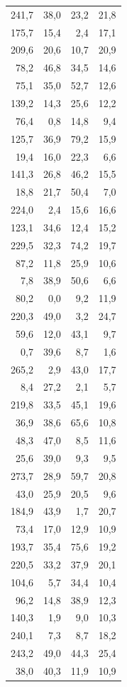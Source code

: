\documentclass[
  letterpaper,
  DIV=11,
  numbers=noendperiod]{scrreprt}
\begin{document}
\begin{longtable*}{rrrr}
241,7 & 38,0 & 23,2 & 21,8 \\ 
175,7 & 15,4 & 2,4 & 17,1 \\ 
209,6 & 20,6 & 10,7 & 20,9 \\ 
78,2 & 46,8 & 34,5 & 14,6 \\ 
75,1 & 35,0 & 52,7 & 12,6 \\ 
139,2 & 14,3 & 25,6 & 12,2 \\ 
76,4 & 0,8 & 14,8 & 9,4 \\ 
125,7 & 36,9 & 79,2 & 15,9 \\ 
19,4 & 16,0 & 22,3 & 6,6 \\ 
141,3 & 26,8 & 46,2 & 15,5 \\ 
18,8 & 21,7 & 50,4 & 7,0 \\ 
224,0 & 2,4 & 15,6 & 16,6 \\ 
123,1 & 34,6 & 12,4 & 15,2 \\ 
229,5 & 32,3 & 74,2 & 19,7 \\ 
87,2 & 11,8 & 25,9 & 10,6 \\ 
7,8 & 38,9 & 50,6 & 6,6 \\ 
80,2 & 0,0 & 9,2 & 11,9 \\ 
220,3 & 49,0 & 3,2 & 24,7 \\ 
59,6 & 12,0 & 43,1 & 9,7 \\ 
0,7 & 39,6 & 8,7 & 1,6 \\ 
265,2 & 2,9 & 43,0 & 17,7 \\ 
8,4 & 27,2 & 2,1 & 5,7 \\ 
219,8 & 33,5 & 45,1 & 19,6 \\ 
36,9 & 38,6 & 65,6 & 10,8 \\ 
48,3 & 47,0 & 8,5 & 11,6 \\ 
25,6 & 39,0 & 9,3 & 9,5 \\ 
273,7 & 28,9 & 59,7 & 20,8 \\ 
43,0 & 25,9 & 20,5 & 9,6 \\ 
184,9 & 43,9 & 1,7 & 20,7 \\ 
73,4 & 17,0 & 12,9 & 10,9 \\ 
193,7 & 35,4 & 75,6 & 19,2 \\ 
220,5 & 33,2 & 37,9 & 20,1 \\ 
104,6 & 5,7 & 34,4 & 10,4 \\ 
96,2 & 14,8 & 38,9 & 12,3 \\ 
140,3 & 1,9 & 9,0 & 10,3 \\ 
240,1 & 7,3 & 8,7 & 18,2 \\ 
243,2 & 49,0 & 44,3 & 25,4 \\ 
38,0 & 40,3 & 11,9 & 10,9 \\ 

\end{longtable*}
\end{document}
